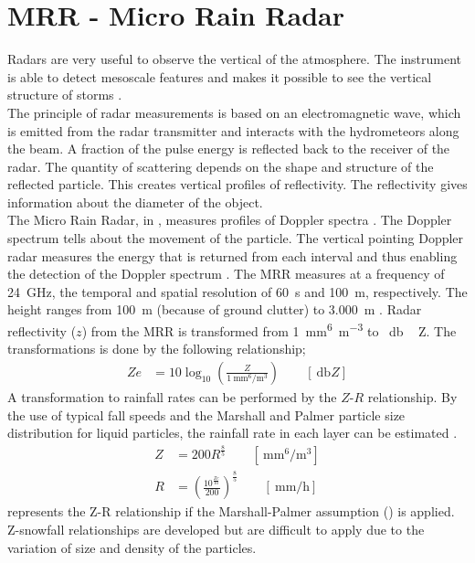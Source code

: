 \section{MRR - Micro Rain Radar}

Radars are very useful to observe the vertical of the atmosphere. The instrument is able to detect mesoscale features and makes it possible to see the vertical structure of storms \citep{markowski_mesoscale_2011}.\\
The principle of radar measurements is based on an electromagnetic wave, which is emitted from the radar transmitter and interacts with the hydrometeors along the beam. A fraction of the pulse energy is reflected back to the receiver of the radar. The quantity of scattering depends on the shape and structure of the reflected particle. This creates vertical profiles of reflectivity. The reflectivity gives information about the diameter of the object. 
\\
The Micro Rain Radar, in , measures profiles of Doppler spectra \citep{metek_micro_2010}. The Doppler spectrum tells about the movement of the particle. The vertical pointing Doppler radar measures the energy that is returned from each interval and thus enabling the detection of the Doppler spectrum \citep{lecuyer_aos_2017}. The MRR measures at a frequency of \SI{24}{\giga\Hz}, the temporal and spatial resolution of \SI{60}{\second} and \SI{100}{\metre}, respectively. The height ranges from \SI{100}{\metre} (because of ground clutter) to \SI{3.000}{\metre} \citep{metek_micro_2010}.
\newline \newline
\noindent 
Radar reflectivity ($z$) from the MRR is transformed from \SI{1}{\mm^6\per\metre^3} to \SI{}{\decibel\,Z}.
The transformations is done by the following relationship;
\begin{align}
	Ze & = 10 \log_{10} \left(\frac{Z}{\SI{1}{\mm^6\per\metre^3}}\right) \qquad [\SI{}{\decibel Z}]
	\label{eq:Ze}
\end{align}
A transformation to rainfall rates can be performed by the $Z$-$R$ relationship. By the use of typical fall speeds and the Marshall and Palmer particle size distribution for liquid particles, the rainfall rate in each layer can be estimated \citep{rinehart_radar_2010}. 
\begin{align}
	Z & = 200 R^{\frac{8}{5}} \qquad [\SI{}{\mm^6\per\metre^3}] \nonumber \\ 
	R & = \left( \frac{ 10^{\frac{Ze}{10}} }{200} \right)^{\frac{8}{5}} \qquad [\SI{}{\mm\per\hour}]
	\label{eq:Z-R}
\end{align}
 represents the Z-R relationship if the Marshall-Palmer assumption () is applied. Z-snowfall relationships are developed but are difficult to apply due to the variation of size and density of the particles.

